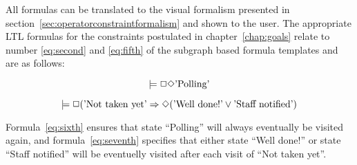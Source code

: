 All formulas can be translated to the visual formalism presented in section~\ref{sec:operatorconstraintformalism} and shown to the user. The appropriate LTL formulas for the constraints postulated in chapter~\ref{chap:goals} relate to number \ref{eq:second} and \ref{eq:fifth} of the subgraph based formula templates and are as follows:

\begin{equation} \label{eq:sixth}
  \models \Box \Diamond \textnormal{'Polling'}
\end{equation}

\begin{equation} \label{eq:seventh}
	\models \Box (\textnormal{'Not taken yet'} \Rightarrow \Diamond (\textnormal{'Well done!'} \vee \textnormal{'Staff notified'})
\end{equation}

Formula~\ref{eq:sixth} ensures that state ``Polling'' will always eventually be visited again, and formula~\ref{eq:seventh} specifies that either state ``Well done!'' or state ``Staff notified'' will be eventuelly visited after each visit of ``Not taken yet''.